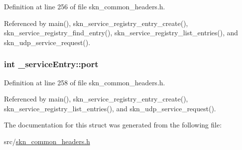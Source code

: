 Definition at line 256 of file skn\+\_\+common\+\_\+headers.\+h.



Referenced by main(), skn\+\_\+service\+\_\+registry\+\_\+entry\+\_\+create(), skn\+\_\+service\+\_\+registry\+\_\+find\+\_\+entry(), skn\+\_\+service\+\_\+registry\+\_\+list\+\_\+entries(), and skn\+\_\+udp\+\_\+service\+\_\+request().

\hypertarget{struct__service_entry_ac8a3a40de5eee937afb42faea4d18bb2}{
\subsubsection[{port}]{\setlength{\rightskip}{0pt plus 5cm}int \+\_\+service\+Entry\+::port}}\label{struct__service_entry_ac8a3a40de5eee937afb42faea4d18bb2}


Definition at line 258 of file skn\+\_\+common\+\_\+headers.\+h.



Referenced by main(), skn\+\_\+service\+\_\+registry\+\_\+entry\+\_\+create(), skn\+\_\+service\+\_\+registry\+\_\+list\+\_\+entries(), and skn\+\_\+udp\+\_\+service\+\_\+request().



The documentation for this struct was generated from the following file\+:\begin{DoxyCompactItemize}
\item 
src/\hyperlink{skn__common__headers_8h}{skn\+\_\+common\+\_\+headers.\+h}\end{DoxyCompactItemize}
